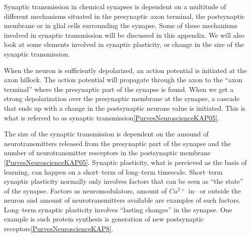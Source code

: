 Synaptic transmission in chemical synapses is dependent on a multitude of different mechanisms situated in the presynaptic axon terminal, the postsynaptic membrane or in glial cells surrounding the synapse.
Some of these mechanisms involved in synaptic transmission will be discussed in this appendix.
We will also look at some elements involved in synaptic plasticity, or change in the size of the synaptic transmission. %


When the neuron is sufficiently depolarized, an action potential is initiated at the axon hillock.
The action potential will propagate through the axon to the ``axon terminal'' where the presynaptic part of the synapse is found.
When we get a strong depolarization over the presynaptic membrane at the synapse, a cascade that ends up with a change in the postsynaptic neurons value is initiated.
This is what is referred to as synaptic transmission\ref{PurvesNeuroscienceKAP05}.

The size of the synaptic transmission is dependent on the amound of neurotransmitters released from the presynaptic part of the synapse and the number of neurotransmitter resceptors in the postsynaptic membrane
		\ref{PurvesNeuroscienceKAP05}. 
Synaptic plasticity, what is percieved as the basis of learning, can happen on a short--term of long--term timescale.
Short--term synaptic plasticity normally only involves factors that can be seen as ``the state'' of the synapse. 
Factors as neuromodulators, amount of $Ca^{2+}$ in-- or outside the neuron and amount of neurotransmitters available are examples of such factors.
Long--term synaptic plasticity involves ``lasting changes'' in the synapse. One example is such protein synthesis is generation of new postsynaptic receptors\ref{PurvesNeuroscienceKAP8}. %

